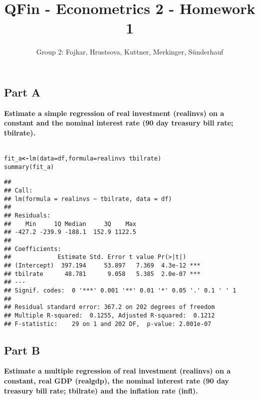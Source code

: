 \documentclass{article}\usepackage[]{graphicx}\usepackage[]{color}
\title{QFin - Econometrics 2 - Homework 1}
\author{Group 2: Fojkar, Hrustsova, Kuttner, Merkinger, Sünderhauf}
\makeatletter
\newcommand{\hlopt}[1]{\textcolor[rgb]{1,0,0.502}{\textbf{#1}}}%
\newcommand{\hlstd}[1]{\textcolor[rgb]{0,0,0}{#1}}%
\newcommand{\hlkwb}[1]{\textcolor[rgb]{0.502,0.502,0.753}{\textbf{#1}}}%
\newcommand{\hlkwc}[1]{\textcolor[rgb]{0,0.502,0.753}{#1}}%
\newcommand{\hlkwd}[1]{\textcolor[rgb]{0,0.267,0.4}{#1}}%
\newenvironment{kframe}{%
 \def\at@end@of@kframe{}%
 \ifinner\ifhmode%
  \def\at@end@of@kframe{\end{minipage}}%
  \begin{minipage}{\columnwidth}%
 \fi\fi%
 \def\FrameCommand##1{\hskip\@totalleftmargin \hskip-\fboxsep
 \colorbox{shadecolor}{##1}\hskip-\fboxsep
     \hskip-\linewidth \hskip-\@totalleftmargin \hskip\columnwidth}%
 \MakeFramed {\advance\hsize-\width
   \@totalleftmargin\z@ \linewidth\hsize
   \@setminipage}}%
 {\par\unskip\endMakeFramed%
 \at@end@of@kframe}
\newenvironment{knitrout}{}{} %
\newcommand{\1}{\mathbb{1}}
\makeatother
\begin{document}
\setlength\parindent{0pt}
\maketitle



\subsection*{Part A}
\textbf{Estimate a simple regression of real investment (realinvs) on a constant and the nominal interest rate (90 day treasury bill rate; tbilrate).} \\\\


\begin{knitrout}
\color{fgcolor}\begin{kframe}
\begin{alltt}
\hlstd{fit_a} \hlkwb{<-} \hlkwd{lm}\hlstd{(}\hlkwc{data} \hlstd{= df,} \hlkwc{formula} \hlstd{= realinvs} \hlopt{~} \hlstd{tbilrate)}
\hlkwd{summary}\hlstd{(fit_a)}
\end{alltt}
\begin{verbatim}
## 
## Call:
## lm(formula = realinvs ~ tbilrate, data = df)
## 
## Residuals:
##    Min     1Q Median     3Q    Max 
## -427.2 -239.9 -188.1  152.9 1122.5 
## 
## Coefficients:
##             Estimate Std. Error t value Pr(>|t|)    
## (Intercept)  397.194     53.897   7.369  4.3e-12 ***
## tbilrate      48.781      9.058   5.385  2.0e-07 ***
## ---
## Signif. codes:  0 '***' 0.001 '**' 0.01 '*' 0.05 '.' 0.1 ' ' 1
## 
## Residual standard error: 367.2 on 202 degrees of freedom
## Multiple R-squared:  0.1255,	Adjusted R-squared:  0.1212 
## F-statistic:    29 on 1 and 202 DF,  p-value: 2.001e-07
\end{verbatim}
\end{kframe}
\end{knitrout}


\subsection*{Part B}
\textbf{Estimate a multiple regression of real investment (realinvs) on a constant, real GDP (realgdp), the nominal interest rate (90 day treasury bill rate; tbilrate) and the inflation rate (infl).}\\\\
\end{document}
